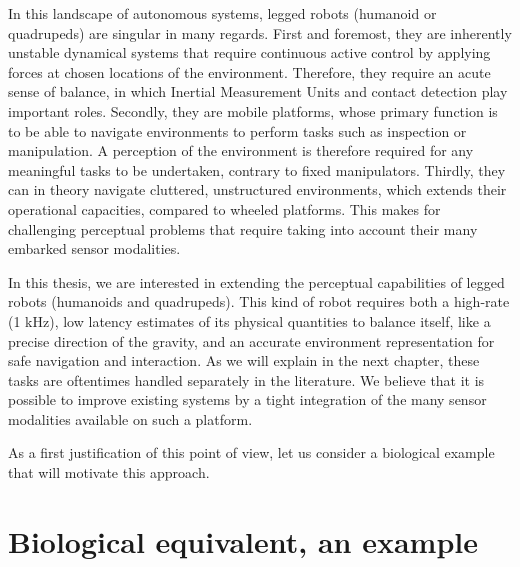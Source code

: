 In this landscape of autonomous systems, legged robots  (humanoid or quadrupeds) are singular in many regards. 
First and foremost, they are inherently unstable dynamical systems that require continuous active control by applying forces at chosen locations of the environment. 
Therefore, they require an acute sense of balance, in which Inertial Measurement Units and contact detection play important roles. 
Secondly, they are mobile platforms, whose primary function is to be able to navigate environments to perform tasks such as inspection or manipulation.
A perception of the environment is therefore required for any meaningful tasks to be undertaken, contrary to fixed manipulators.
Thirdly, they can in theory navigate cluttered, unstructured environments, which extends their operational capacities, compared to wheeled platforms.
This makes for challenging perceptual problems that require taking into account their many embarked sensor modalities.

In this thesis, we are interested in extending the perceptual capabilities of legged robots (humanoids and quadrupeds). This kind of robot requires both a high-rate (1 kHz),
low latency estimates of its physical quantities to balance itself, like a precise direction of the gravity, 
and an accurate environment representation for safe navigation and interaction.
As we will explain in the next chapter, these tasks are oftentimes handled separately in the literature. We believe that it is possible to improve existing systems by a tight integration of the
many sensor modalities available on such a platform.

As a first justification of this point of view, let us consider a biological example that will motivate this approach.


\section{Biological equivalent, an example}

